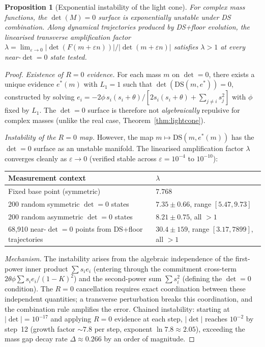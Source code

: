 \documentclass[11pt,a4paper]{article}
\newtheorem{proposition}[theorem]{Proposition}
\theoremstyle{definition}
\theoremstyle{remark}
\begin{document}
\begin{proposition}[Exponential instability of the light cone]\label{thm:instability}
For complex mass functions, the $\det(M)=0$ surface is exponentially unstable under DS combination. Along dynamical trajectories produced by DS+floor evolution, the linearised transverse amplification factor $\lambda=\lim_{\varepsilon\to 0}|\det(F(m+\varepsilon n))|/|\det(m+\varepsilon n)|$ satisfies $\lambda>1$ at every near-$\det=0$ state tested.
\end{proposition}

\begin{proof}
\emph{Existence of $R=0$ evidence.} For each mass $m$ on $\det=0$, there exists a unique evidence $e^*(m)$ with $L_1=1$ such that $\det(\mathrm{DS}(m,e^*))=0$, constructed by solving $e_i=-2\phi\, s_i(s_i+\theta)/[2s_i(s_i+\theta)+\sum_{j\neq i}s_j^2]$ with $\phi$ fixed by $L_1$. The $\det=0$ surface is therefore not \emph{algebraically} repulsive for complex masses (unlike the real case, Theorem~\ref{thm:lightcone}).

\emph{Instability of the $R=0$ map.} However, the map $m\mapsto\mathrm{DS}(m,e^*(m))$ has the $\det=0$ surface as an unstable manifold. The linearised amplification factor $\lambda$ converges cleanly as $\varepsilon\to 0$ (verified stable across $\varepsilon=10^{-4}$ to $10^{-10}$):

\begin{center}
\begin{tabular}{ll}
\toprule
Measurement context & $\lambda$ \\
\midrule
Fixed base point (symmetric) & $7.768$ \\
200 random symmetric $\det=0$ states & $7.35\pm 0.66$, range $[5.47, 9.73]$ \\
200 random asymmetric $\det=0$ states & $8.21\pm 0.75$, all ${}>1$ \\
68{,}910 near-$\det=0$ points from DS+floor trajectories & $30.4\pm 159$, range $[3.17, 7899]$, all ${}>1$ \\
\bottomrule
\end{tabular}
\end{center}

\emph{Mechanism.} The instability arises from the algebraic independence of the first-power inner product $\sum s_ie_i$ (entering through the commitment cross-term $2\theta\phi\sum s_ie_i/(1-K)^2$) and the second-power sum $\sum s_i^2$ (defining the $\det=0$ condition). The $R=0$ cancellation requires exact coordination between these independent quantities; a transverse perturbation breaks this coordination, and the combination rule amplifies the error. Chained instability: starting at $|\det|=10^{-17}$ and applying $R=0$ evidence at each step, $|\det|$ reaches $10^{-2}$ by step~12 (growth factor $\sim\!7.8$ per step, exponent $\ln 7.8\approx 2.05$), exceeding the mass gap decay rate $\Delta\approx 0.266$ by an order of magnitude.


\end{proof}
\end{document}
